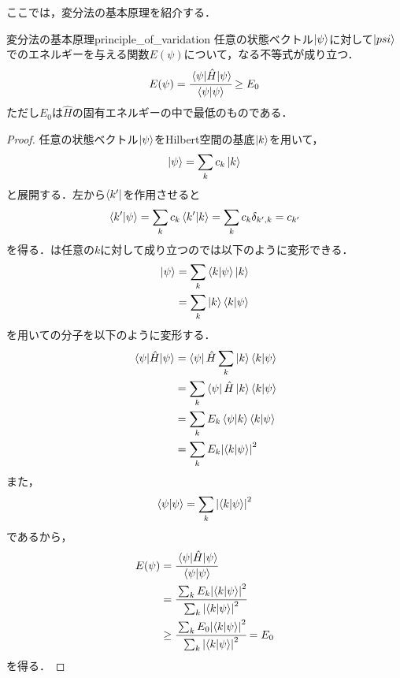 \documentclass{report}
\begin{document}
  ここでは，変分法の基本原理を紹介する．
  \begin{myprop}{変分法の基本原理}{principle_of_varidation}
    任意の状態ベクトル$\ket{\psi}$に対して$\ket{psi}$でのエネルギーを与える関数$E(\psi)$について，なる不等式が成り立つ．
    \begin{align}
      E(\psi) = \cfrac{\mel{\psi}{\hat{H}}{\psi}}{\braket{\psi}} \geq E_0 \label{minimum}
    \end{align}
    ただし$E_0$は$\hat{H}$の固有エネルギーの中で最低のものである．
    \tcblower
    \begin{proof}
      任意の状態ベクトル$\ket{\psi}$をHilbert空間の基底$\ket{k}$を用いて，
      \begin{align}
        \ket{\psi} = \sum_{k} c_k\ket{k} \label{basis_expansion}
      \end{align}
      と展開する．左から$\bra{k'}$を作用させると
      \begin{align}
        \braket{k'}{\psi} = \sum_{k}c_k\bra{k'}\ket{k} = \sum_{k}c_k\delta_{k',k} = c_{k'} \label{basis_expansion2}
      \end{align}
      を得る．は任意の$k$に対して成り立つのでは以下のように変形できる．
      \begin{align}
        \ket{\psi} &= \sum_{k}\braket{k}{\psi}\ket{k}\\
        &= \sum_{k}\ket{k}\bra{k}\ket{\psi} \label{basis_expansion3}
      \end{align}
      を用いての分子を以下のように変形する．
      \begin{align}
        \mel{\psi}{\hat{H}}{{\psi}} &= \bra{\psi}\hat{H}\sum_{k}\ket{k}\braket{k}{\psi}\\
        &= \sum_{k}\bra{\psi}\hat{H}\ket{k}\braket{k}{\psi} \\
        &= \sum_{k}E_k\bra{\psi}\ket{k}\braket{k}{\psi} \\
        &= \sum_{k}E_k\abs{\braket{k}{\psi}}^2
      \end{align}
      また，
      \begin{align}
        \braket{\psi}{\psi}=\sum_{k}\abs{\braket{k}{\psi}}^2
      \end{align}
      であるから，
      \begin{align}
        E(\psi) &= \cfrac{\mel{\psi}{\hat{H}}{\psi}}{\braket{\psi}{\psi} } \\ 
        &= \cfrac{\sum_{k}E_k\abs{\braket{k}{\psi}}^2}{\sum_{k}\abs{\braket{k}{\psi}}^2} \\ 
        &\geq \cfrac{\sum_{k}E_0\abs{\braket{k}{\psi}}^2}{\sum_{k}\abs{\braket{k}{\psi}}^2} = E_0
      \end{align}
      を得る．
    \end{proof}
  \end{myprop}
\end{document}
